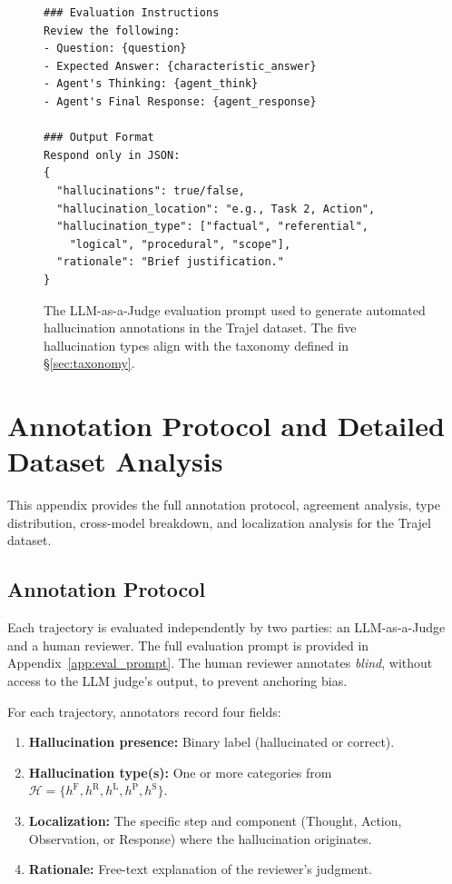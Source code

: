 \documentclass{article}
\begin{document}
\begin{figure}[H]
\begin{verbatim}
### Evaluation Instructions
Review the following:
- Question: {question}
- Expected Answer: {characteristic_answer}
- Agent's Thinking: {agent_think}
- Agent's Final Response: {agent_response}

### Output Format
Respond only in JSON:
{
  "hallucinations": true/false,
  "hallucination_location": "e.g., Task 2, Action",
  "hallucination_type": ["factual", "referential",
    "logical", "procedural", "scope"],
  "rationale": "Brief justification."
}
\end{verbatim}
\caption{The LLM-as-a-Judge evaluation prompt used to generate automated hallucination
annotations in the Trajel dataset. The five hallucination types align with the taxonomy
defined in \S\ref{sec:taxonomy}.}
\label{fig:eval_prompt}
\end{figure}

\section{Annotation Protocol and Detailed Dataset Analysis}
\label{app:annotation_details}

This appendix provides the full annotation protocol, agreement analysis, type distribution, cross-model breakdown, and localization analysis for the Trajel dataset.

\subsection{Annotation Protocol}
\label{app:annotation_protocol}

Each trajectory is evaluated independently by two parties: an LLM-as-a-Judge and a human reviewer. The full evaluation prompt is provided in Appendix~\ref{app:eval_prompt}. The human reviewer annotates \emph{blind}, without access to the LLM judge's output, to prevent anchoring bias.

For each trajectory, annotators record four fields:
\begin{enumerate}
    \item \textbf{Hallucination presence:} Binary label (hallucinated or correct).
    \item \textbf{Hallucination type(s):} One or more categories from $\mathcal{H} = \{h^{\text{F}}, h^{\text{R}}, h^{\text{L}}, h^{\text{P}}, h^{\text{S}}\}$.
    \item \textbf{Localization:} The specific step and component (Thought, Action, Observation, or Response) where the hallucination originates.
    \item \textbf{Rationale:} Free-text explanation of the reviewer's judgment.
\end{enumerate}
\end{document}
